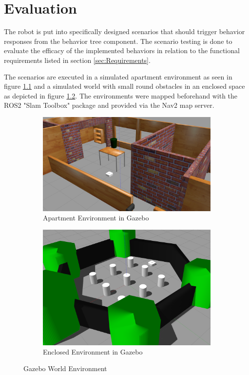 \chapter{Evaluation}
\label{cha:ergebnisse}

The robot is put into specifically designed scenarios that should trigger behavior responses from the behavior tree component. The scenario testing is done to evaluate the efficacy of the implemented behaviors in relation to the functional requirements listed in section \ref{sec:Requirements}.

The scenarios are executed in a simulated apartment environment as seen in figure \ref{fig:house_gazebo} and a simulated world with small round obstacles in an enclosed space as depicted in figure \ref{fig:world_gazebo}. The environments were mapped beforehand with the ROS2 "Slam Toolbox" package and provided via the Nav2 map server. 
 
\begin{figure}[ht]
	\centering
	\begin{subfigure}[b]{0.45\textwidth}
		\centering
		\includegraphics[width=\textwidth]{images/house_env.png}
		\caption{Apartment Environment in Gazebo}
		\label{fig:house_gazebo}
	\end{subfigure}
	\hfill
	\begin{subfigure}[b]{0.45\textwidth}
		\centering
		\includegraphics[width=\textwidth]{images/world_env.png}
\caption{Enclosed Environment in Gazebo}
		\label{fig:world_gazebo}
	\end{subfigure}
	\caption{Gazebo World Environment}
	\label{fig:three graphs}
\end{figure}

